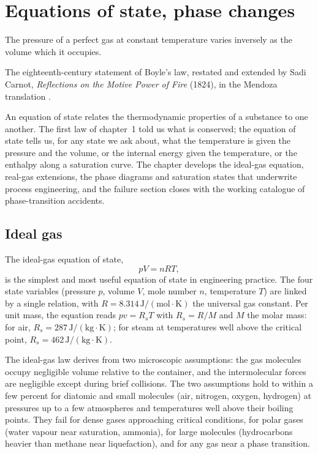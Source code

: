 \chapter{Equations of state, phase changes}
\label{vol04:ch02}

\epigraph{The pressure of a perfect gas at constant temperature varies
inversely as the volume which it occupies.}{The eighteenth-century
statement of Boyle's law, restated and extended by Sadi Carnot,
\emph{Reflections on the Motive Power of Fire} (1824), in the Mendoza
translation \cite[p.~14]{hist:carnot1824}.}


\noindent
An equation of state relates the thermodynamic properties of a
substance to one another. The first law of chapter~1 told us what is
conserved; the equation of state tells us, for any state we ask about,
what the temperature is given the pressure and the volume, or the
internal energy given the temperature, or the enthalpy along a
saturation curve. The chapter develops the ideal-gas equation, real-gas
extensions, the phase diagrams and saturation states that underwrite
process engineering, and the failure section closes with the working
catalogue of phase-transition accidents.

\section{Ideal gas}

The ideal-gas equation of state,
\[
pV = nRT,
\]
is the simplest and most useful equation of state in engineering
practice. The four state variables (pressure $p$, volume $V$, mole
number $n$, temperature $T$) are linked by a single relation, with
$R = 8.314\,\text{J}/(\text{mol}\cdot\si{\kelvin})$ the universal gas
constant. Per unit mass, the equation reads $pv = R_s T$ with $R_s =
R/M$ and $M$ the molar mass: for air, $R_s = 287\,\text{J}/(\text{kg}
\cdot\si{\kelvin})$; for steam at temperatures well above the critical
point, $R_s = 462\,\text{J}/(\text{kg}\cdot\si{\kelvin})$.

The ideal-gas law derives from two microscopic assumptions: the gas
molecules occupy negligible volume relative to the container, and the
intermolecular forces are negligible except during brief collisions.
The two assumptions hold to within a few percent for diatomic and
small molecules (air, nitrogen, oxygen, hydrogen) at pressures up to a
few atmospheres and temperatures well above their boiling points. They
fail for dense gases approaching critical conditions, for polar gases
(water vapour near saturation, ammonia), for large molecules
(hydrocarbons heavier than methane near liquefaction), and for any
gas near a phase transition.

